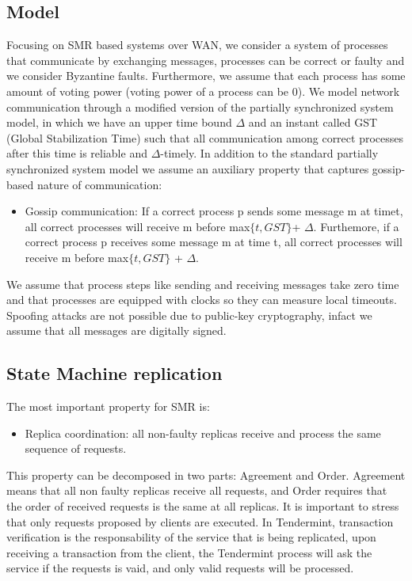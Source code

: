 \documentclass{article}
\begin{document}
   \subsection{Model}
   Focusing on SMR based systems over WAN, we consider a system of processes that communicate by exchanging messages, processes can be correct or faulty and we consider Byzantine faults. Furthermore, we assume that each process has some amount of voting power (voting power of a process can be 0). We model network communication through a modified version of the partially synchronized system model, in which we have an upper time bound $\Delta$ and an instant called GST (Global Stabilization Time) such that all  communication among correct processes after this time is reliable and $\Delta$-timely. In addition to the standard partially synchronized system model we assume an auxiliary property that captures gossip-based nature of communication:
\begin{itemize}
\item Gossip communication: If a correct process p sends some message m at timet, all correct processes will receive m before max$\{t,GST\} $+ $\Delta$. Furthemore, if a correct process p receives some message m at time t, all correct processes will receive m before max$\{t,GST\}$ + $\Delta$.
\end{itemize}
  We assume that process steps like sending and receiving messages take zero time and that processes are equipped with clocks so they can measure local timeouts. Spoofing attacks are not possible due to public-key cryptography, infact we assume that all messages are digitally signed.

   \subsection{State Machine replication}
 The most important property for SMR is: 
   \begin{itemize}
   	\item Replica coordination: all non-faulty replicas receive and process the same sequence of requests.
   \end{itemize}
 This property can be decomposed in two parts: Agreement and Order. 
Agreement means that all non faulty replicas receive all requests, and Order requires that the order of received requests is the same at all replicas.
It is important to stress that only requests proposed by clients are executed. In Tendermint, transaction verification is the responsability of the service that is being replicated, upon receiving a transaction from the client, the Tendermint process will ask the service if the requests is vaid, and only valid requests will be processed.
  
\end{document}
